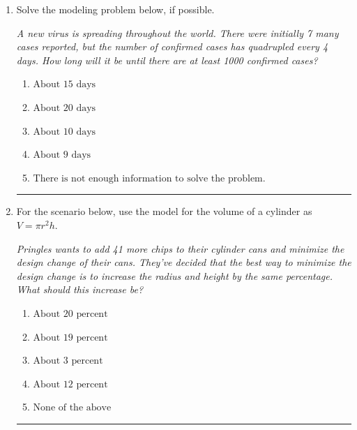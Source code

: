 \documentclass[14pt]{extbook}
\newcommand{\litem}[1]{\item#1\hspace*{-1cm}\rule{\textwidth}{0.4pt}}
\begin{document}
\begin{enumerate}
{\begin{enumerate}[label=\Alph*.]
\end{enumerate} }
\litem{
Solve the modeling problem below, if possible.
\begin{center}
    \textit{ A new virus is spreading throughout the world. There were initially 7 many cases reported, but the number of confirmed cases has quadrupled every 4 days. How long will it be until there are at least 1000 confirmed cases? }
\end{center}
\begin{enumerate}[label=\Alph*.]
\item \( \text{About } 15 \text{ days} \)
\item \( \text{About } 20 \text{ days} \)
\item \( \text{About } 10 \text{ days} \)
\item \( \text{About } 9 \text{ days} \)
\item \( \text{There is not enough information to solve the problem.} \)

\end{enumerate} }
\litem{
For the scenario below, use the model for the volume of a cylinder as $V = \pi r^2 h$.
\begin{center}
    \textit{ Pringles wants to add 41 \text{percent} more chips to their cylinder cans and minimize the design change of their cans. They've decided that the best way to minimize the design change is to increase the radius and height by the same percentage. What should this increase be? }
\end{center}
\begin{enumerate}[label=\Alph*.]
\item \( \text{About } 20 \text{ percent} \)
\item \( \text{About } 19 \text{ percent} \)
\item \( \text{About } 3 \text{ percent} \)
\item \( \text{About } 12 \text{ percent} \)
\item \( \text{None of the above} \)


\end{enumerate}}
\end{enumerate}
\end{document}
